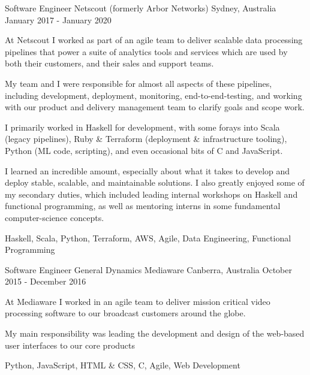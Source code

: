 \begin{cventries}
\cventry
{Software Engineer} %
{Netscout (formerly Arbor Networks)} %
{Sydney, Australia} %
{January 2017 - January 2020 } %
{ %
\begin{cvitems}
\item {At Netscout I worked as part of an agile team to deliver scalable data processing pipelines that power a suite of analytics tools and services which are used by both their customers, and their sales and support teams.}
\item {My team and I were responsible for almost all aspects of these pipelines, including development, deployment, monitoring, end-to-end-testing, and working with our product and delivery management team to clarify goals and scope work.}
\item {I primarily worked in Haskell for development, with some forays into Scala (legacy pipelines), Ruby \& Terraform (deployment \& infrastructure tooling), Python (ML code, scripting), and even occasional bits of C and JavaScript.}
\item {I learned an incredible amount, especially about what it takes to develop and deploy stable, scalable, and maintainable solutions. I also greatly enjoyed some of my secondary duties, which included leading internal workshops on Haskell and functional programming, as well as mentoring interns in some fundamental computer-science concepts.}
\end{cvitems}
}
{ Haskell, Scala, Python, Terraform, AWS, Agile, Data Engineering, Functional Programming }



\cventry
{Software Engineer} %
{General Dynamics Mediaware} %
{Canberra, Australia} %
{October 2015 - December 2016} %
{ %
\begin{cvitems}
  \item {At Mediaware I worked in an agile team to deliver mission critical video processing software to our broadcast customers around the globe.}
  \item {My main responsibility was leading the development and design of the web-based user interfaces to our core products}
\end{cvitems}
}
{Python, JavaScript, HTML \& CSS, C, Agile, Web Development}


\end{cventries}
